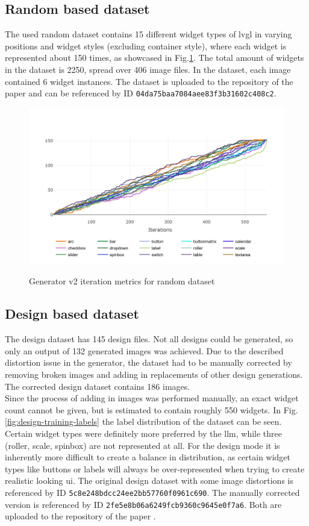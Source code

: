 \documentclass[Bachelor, BIC, english, fhCitStyle, IEEE]{BASE/twbook} %
\def\code#1{\texttt{#1}}
\begin{document}
\subsection{Random based dataset}
The used random dataset contains 15 different widget types of \ac{lvgl} in varying positions and widget styles (excluding container style), where each widget is represented about 150 times, as showcased in Fig.\ref{fig:random-widget-metrics}. The total amount of widgets in the dataset is 2250, spread over 406 image files.
In the dataset, each image contained 6 widget instances. The dataset is uploaded to the repository of the paper \autocite{ReleaseFinalPaper} and can be referenced by ID \code{04da75baa7084aee83f3b31602c408c2}.
\begin{figure}[H]
    \caption{Generator v2 iteration metrics for random dataset}
    \centering
    \includegraphics[width=\textwidth]{random_widget_metrics.png}
    \label{fig:random-widget-metrics}
\end{figure}
\subsection{Design based dataset}
The design dataset has 145 design files. Not all designs could be generated, so only an output of 132 generated images was achieved. Due to the described distortion issue in the generator, the dataset had to be manually corrected by removing broken images and adding in replacements of other design generations. The corrected design dataset contains 186 images.\\
Since the process of adding in images was performed manually, an exact widget count cannot be given, but is estimated to contain roughly 550 widgets. In Fig.\ref{fig:design-training-labels} the label distribution of the dataset can be seen.\\
Certain widget types were definitely more preferred by the \ac{llm}, while three (roller, scale, spinbox) are not represented at all. For the design mode it is inherently more difficult to create a balance in distribution, as certain widget types like buttons or labels will always be over-represented when trying to create realistic looking \ac{ui}.
The original design dataset with some image distortions is referenced by ID \code{5c8e248bdcc24ee2bb57760f0961c690}. The manually corrected version is referenced by ID \code{2fe5e8b06a6249fcb9360c9645e0f7a6}. Both are uploaded to the repository of the paper \autocite{ReleaseFinalPaper}.
\end{document}
